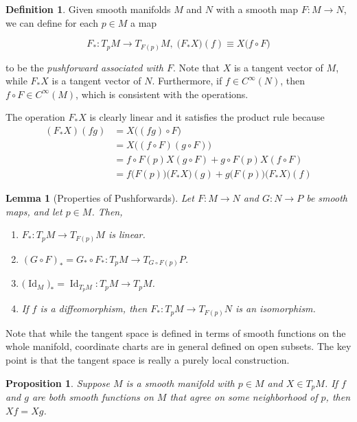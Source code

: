 \documentclass{article}
\DeclareMathOperator{\Id}{Id}
\newtheorem{proposition}[theorem]{Proposition}
\newtheorem{lemma}[theorem]{Lemma}
\theoremstyle{remark}
\theoremstyle{definition}
\newtheorem{definition}{Definition}[section]
\begin{document}
    \begin{definition}
      Given smooth manifolds $M$ and $N$ with a smooth map $F: M \longrightarrow N$, we can define for each $p \in M$ a map

        \[F_*: T_p M \longrightarrow T_{F(p)} M, \; \big(F_* X \big) (f) \equiv X \big( f \circ F \big) \]

      to be the \textit{pushforward associated with $F$}. Note that $X$ is a tangent vector of $M$, while $F_* X$ is a tangent vector of $N$. Furthermore, if $f \in C^\infty(N)$, then $f \circ F \in C^\infty (M)$, which is consistent with the operations. 

      The operation $F_* X$ is clearly linear and it satisfies the product rule because
      \begin{align*}
        (F_* X) (f g) & = X \big((fg) \circ F \big) \\
        & = X \big( (f \circ F) (g \circ F) \big) \\
        & = f \circ F(p) X(g \circ F) + g \circ F(p) X (f \circ F) \\
        & = f\big(F(p)\big) \big( F_* X \big) (g) + g \big( F(p)\big) \big( F_* X\big) (f)
      \end{align*}
    \end{definition}


    \begin{lemma}[Properties of Pushforwards]
      Let $F: M \longrightarrow N$ and $G: N \longrightarrow P$ be smooth maps, and let $p \in M$. Then, 
      \begin{enumerate}
        \item $F_*: T_p M \longrightarrow T_{F(p)} M$ is linear. 
        \item $(G \circ F)_* = G_* \circ F_* : T_p M \longrightarrow T_{G \circ F (p)} P$. 
        \item $\big( \Id_M \big)_* = \Id_{T_p M} : T_p M \longrightarrow T_p M$. 
        \item If $f$ is a diffeomorphism, then $F_*: T_p M \longrightarrow T_{F(p)} N$ is an isomorphism. 
      \end{enumerate}
    \end{lemma}

    Note that while the tangent space is defined in terms of smooth functions on the whole manifold, coordinate charts are in general defined on open subsets. The key point is that the tangent space is really a purely local construction. 

    \begin{proposition}
      Suppose $M$ is a smooth manifold with $p \in M$ and $X \in T_p M$. If $f$ and $g$ are both smooth functions on $M$ that agree on some neighborhood of $p$, then $X f = X g$. 
    \end{proposition}
\end{document}

